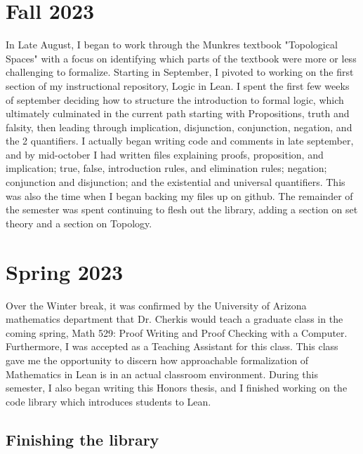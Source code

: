 
\section{Fall 2023}

In Late August, I began to work through the Munkres textbook
"Topological Spaces" with a focus on identifying which parts
of the textbook were more or less challenging to formalize. 
Starting in September, I pivoted to working on the first section
of my instructional repository, Logic in Lean. I spent the first few 
weeks of september deciding how to structure the introduction to 
formal logic, which ultimately culminated in the current path
starting with Propositions, truth and falsity, then leading through
implication, disjunction, conjunction, negation, and the 2 quantifiers.
I actually began writing code and comments in late september, and by
mid-october I had written files explaining proofs, proposition, and
implication; true, false, introduction rules, and elimination rules;
negation; conjunction and disjunction; and the existential and 
universal quantifiers. This was also the time when I began backing 
my files up on github. The remainder of the semester was spent 
continuing to flesh out the library, adding a section on set theory
and a section on Topology.

\section{Spring 2023}

Over the Winter break, it was confirmed by the University of Arizona
mathematics department that Dr. Cherkis would teach a graduate class
in the coming spring, Math 529: Proof Writing and Proof Checking with
a Computer. Furthermore, I was accepted as a Teaching Assistant for
this class. This class gave me the opportunity to discern how 
approachable formalization of Mathematics in Lean is in an actual
classroom environment. During this semester, I also began writing 
this Honors thesis, and I finished working on the code library
which introduces students to Lean. 

\subsection{Finishing the library}

